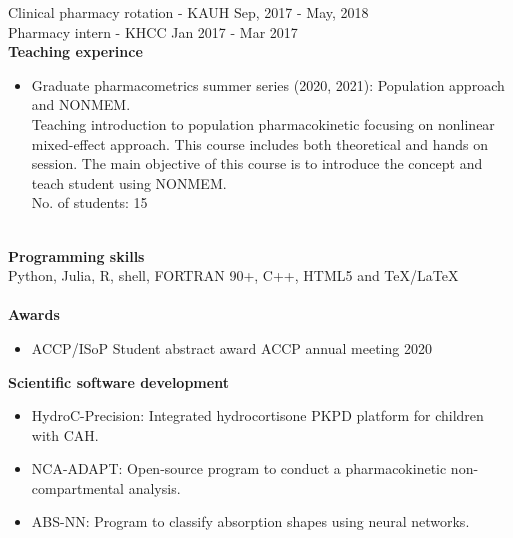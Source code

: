 \documentclass[a4paper,11pt]{article}
\begin{document}
Clinical pharmacy rotation - KAUH \hfill Sep, 2017 - May, 2018 \\

Pharmacy intern - KHCC \hfill Jan 2017 - Mar 2017 \\

\textbf{Teaching experince} \\
\begin{itemize}
\item Graduate pharmacometrics summer series (2020, 2021): Population approach and NONMEM.
~\\
Teaching introduction to population pharmacokinetic focusing on nonlinear mixed-effect approach. This course includes both theoretical and hands on session. The main objective of this course is to introduce the concept and teach student using NONMEM.
~\\
No. of students: 15
\end{itemize}
~\\
\textbf{Programming skills}
~\\
Python, Julia, R, shell, FORTRAN 90+, C++, HTML5 and \TeX/\LaTeX\\
~\\
\textbf{Awards} \\

\begin{itemize}
\item ACCP/ISoP Student abstract award \hfill ACCP annual meeting 2020
\end{itemize}

\textbf{Scientific software development} \\
\begin{itemize}
\item HydroC-Precision: Integrated hydrocortisone PKPD platform for children with CAH.
\item NCA-ADAPT: Open-source program to conduct a pharmacokinetic non-compartmental analysis.
\item ABS-NN: Program to classify absorption shapes using neural networks.
\end{itemize}
\end{document}
